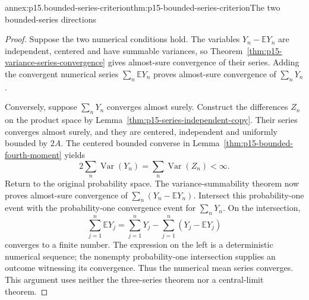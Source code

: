 \begin{annexitem}{annex:p15.bounded-series-criterion}{thm:p15-bounded-series-criterion}{The two bounded-series directions}
\begin{proof}
Suppose the two numerical conditions hold. The variables
\(Y_n-\mathbb EY_n\) are independent, centered and have summable
variances, so Theorem~\ref{thm:p15-variance-series-convergence}
gives almost-sure convergence of their series. Adding the convergent
numerical series \(\sum_n\mathbb EY_n\) proves almost-sure
convergence of \(\sum_nY_n\).

Conversely, suppose \(\sum_nY_n\) converges almost surely.
Construct the differences \(Z_n\) on the product space by
Lemma~\ref{thm:p15-series-independent-copy}. Their series converges
almost surely, and they are centered, independent and uniformly
bounded by \(2A\). The centered bounded converse in
Lemma~\ref{thm:p15-bounded-fourth-moment} yields
\[
 2\sum_n\operatorname{Var}(Y_n)
                  =\sum_n\operatorname{Var}(Z_n)<\infty.
\]
Return to the original probability space. The variance-summability
theorem now proves almost-sure convergence of
\(\sum_n(Y_n-\mathbb EY_n)\). Intersect this probability-one
event with the probability-one convergence event for \(\sum_nY_n\).
On the intersection,
\[
 \sum_{j=1}^n\mathbb EY_j
   =\sum_{j=1}^nY_j-\sum_{j=1}^n(Y_j-\mathbb EY_j)
\]
converges to a finite number. The expression on the left is a
deterministic numerical sequence; the nonempty probability-one
intersection supplies an outcome witnessing its convergence.
Thus the numerical mean series converges. This argument uses neither
the three-series theorem nor a central-limit theorem.
\end{proof}
\end{annexitem}

